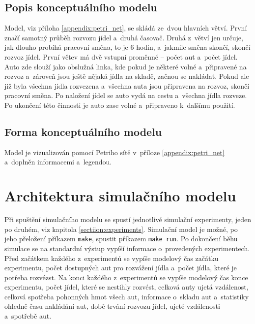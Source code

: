 \documentclass[a4paper, 11pt]{article}
\begin{document}
	\subsection{Popis konceptuálního modelu}
	\label{section:conceptual_model_desc}

	Model, viz příloha \ref{appendix:petri_net}, se skládá ze~dvou hlavních
	větví. První značí samotný průběh rozvozu jídel a~druhá časovač. Druhá
	z~větví jen určuje, jak dlouho probíhá pracovní směna, to je 6 hodin,
	a~jakmile směna skončí, skončí rozvoz jídel. První větev má dvě vstupní
	proměnné -- počet aut a~počet jídel. Auto zde slouží jako obslužná linka,
	kde pokud je některé volné a~připravené na rozvoz a~zároveň jsou ještě
	nějaká jídla na skladě, začnou se nakládat. Pokud ale již byla všechna
	jídla rozvezena a~všechna auta jsou připravena na rozvoz, skončí pracovní
	směna. Po naložení jídel se auto vydá na cestu a~všechna jídla rozveze.
	Po ukončení této činnosti je auto zase volné a~připraveno k~dalšímu použití.


	\subsection{Forma konceptuálního modelu}

	Model je vizualizován pomocí Petriho sítě v~příloze
	\ref{appendix:petri_net} a~doplněn informacemi a~legendou.



	\section{Architektura simulačního modelu}

	Při spuštění simulačního modelu \cite[snímek 44]{IMS_slides} se spustí
	jednotlivé simulační experimenty, jeden po druhém, viz kapitola
	\ref{sectiion:experiments}. Simulační model je možné, po jeho přeložení
	příkazem \texttt{make}, spustit příkazem \texttt{make run}. Po dokončení
	běhu simulace se na standardní výstup vypíší informace o~provedených
	experimentech. Před začátkem každého z~experimentů se vypíše modelový
	čas \cite[snímek 21]{IMS_slides} začátku experimentu, počet dostupných
	aut pro rozvážení jídla a~počet jídla, které je potřeba rozvézst. Na
	konci každého z~experimentů se vypíše modelový čas konce experimentu,
	počet jídel, které se nestihly rozvést, celková auty ujetá vzdálenost,
	celková spotřeba pohonných hmot všech aut, informace o~skladu
	\cite[snímek 184]{IMS_slides} aut a~statistiky ohledně času nakládání aut,
	době trvání rozvozu jídel, ujeté vzdálenosti a~spotřebě aut.
\end{document}
